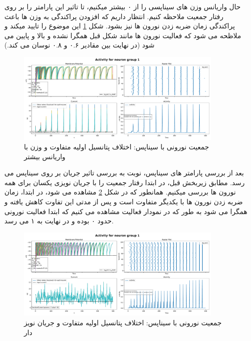 \documentclass{report}
\begin{document}
        حال واریانس وزن های سیناپسی را از ۰ بیشتر میکنیم، تا تاثیر این پارامتر را بر روی رفتار جمعیت ملاحظه کنیم. انتظار داریم که افزودن پراکندگی به وزن ها باعث پراکندگی زمان ضربه زدن نورون ها نیز بشود. شکل 
        \ref{fig:part1-simple-ng-with-synapse-u_init-variance}
        این موضوع را تایید میکند و ملاظحه می شود که فعالیت نورون ها مانند شکل قبل همگرا نشده و بالا و پایین می شود
        (در نهایت بین مقادیر ۰.۶ و ۰.۸ نوسان می کند.)
        \begin{figure}[!ht]
            \centering
            \includegraphics[width=0.9\textwidth]{plots/part1-Simple-ng-with-synapse-u_init-variance.pdf} 
            \caption{جمعیت نورونی با سیناپس: اختلاف پتانسیل اولیه متفاوت و وزن با واریانس بیشتر}
            \label{fig:part1-simple-ng-with-synapse-u_init-variance}
        \end{figure}
        بعد از بررسی پارامتر های سیناپس، نوبت به بررسی تاثیر جریان بر روی سیناپس می رسد. مطابق زیربخش قبل، در ابتدا رفتار جمعیت را با جریان نویزی یکسان برای همه نورون ها بررسی میکنیم. همانطور که در شکل
        \ref{fig:part1-simple-ng-with-synapse-noise-curr}
        مشاهده می شود، در ابتدا، زمان ضربه زدن نورون ها با یکدیگر متفاوت است و پس از مدتی این تفاوت کاهش یافته و همگرا می شود به طور که در نمودار فعالیت مشاهده می کنیم که ابتدا فعالیت نورونی حدود ۰ بوده و در نهایت به ۱ می رسد.
        \begin{figure}[!ht]
            \centering
            \includegraphics[width=0.9\textwidth]{plots/part1-Simple-ng-with-synapse-noise-curr.pdf} 
            \caption{جمعیت نورونی با سیناپس: اختلاف پتانسیل اولیه متفاوت و جریان نویز دار}
            \label{fig:part1-simple-ng-with-synapse-noise-curr}
        \end{figure}
\end{document}
